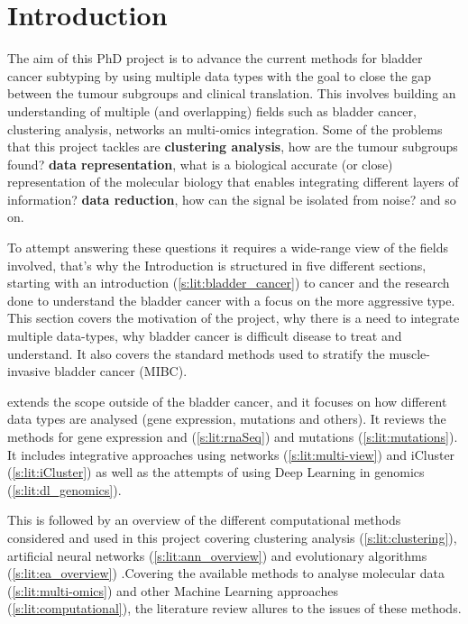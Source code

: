 

\section{Introduction}


The aim of this PhD project is to advance the current methods for bladder cancer subtyping by using multiple data types with the goal to close the gap between the tumour subgroups and clinical translation. This involves building an understanding of multiple (and overlapping) fields such as bladder cancer, clustering analysis, networks an multi-omics integration. Some of the problems that this project tackles are \textbf{clustering analysis}, how are the tumour subgroups found? \textbf{data representation}, what is a biological accurate (or close) representation of the molecular biology that enables integrating different layers of information? \textbf{data reduction}, how can the signal be isolated from noise? and so on. 

To attempt answering these questions it requires a wide-range view of the fields involved, that's why the Introduction is structured in five different sections, starting with an introduction (\cref{s:lit:bladder_cancer}) to cancer and the research done to understand the bladder cancer with a focus on the more aggressive type. This section covers the motivation of the project, why there is a need to integrate multiple data-types, why bladder cancer is difficult disease to treat and understand. It also covers the standard methods used to stratify the muscle-invasive bladder cancer (MIBC).

 extends the scope outside of the bladder cancer, and it focuses on how different data types are analysed (gene expression, mutations and others). It reviews the methods for gene expression and  (\ref{s:lit:rnaSeq}) and mutations (\ref{s:lit:mutations}). It includes integrative approaches using networks (\ref{s:lit:multi-view}) and iCluster (\ref{s:lit:iCluster}) as well as the attempts of using Deep Learning in genomics (\ref{s:lit:dl_genomics}). 

This is followed by an overview of the different computational methods considered and used in this project covering clustering analysis (\ref{s:lit:clustering}), artificial neural networks (\ref{s:lit:ann_overview}) and evolutionary algorithms (\ref{s:lit:ea_overview}) .Covering the available methods to analyse molecular data (\ref{s:lit:multi-omics}) and other Machine Learning approaches (\ref{s:lit:computational}), the literature review allures to the issues of these methods.

